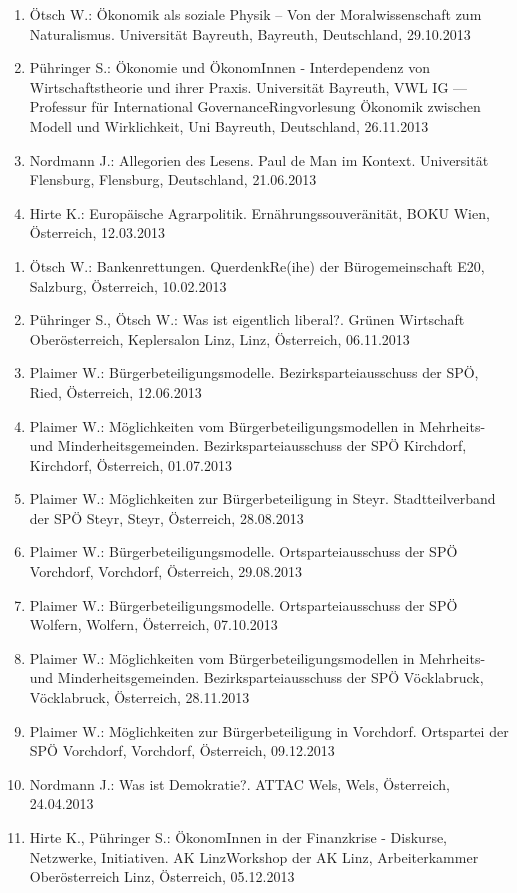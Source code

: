 \begin{enumerate}
	\item Ötsch W.: Ökonomik als soziale Physik – Von der Moralwissenschaft zum Naturalismus. Universität Bayreuth, Bayreuth, Deutschland, 29.10.2013
	\item Pühringer S.: Ökonomie und ÖkonomInnen - Interdependenz von Wirtschaftstheorie und ihrer Praxis. Universität Bayreuth, VWL IG — Professur für International GovernanceRingvorlesung Ökonomik zwischen Modell und Wirklichkeit, Uni Bayreuth, Deutschland, 26.11.2013
	\item Nordmann J.: Allegorien des Lesens. Paul de Man im Kontext. Universität Flensburg, Flensburg, Deutschland, 21.06.2013
	\item Hirte K.: Europäische Agrarpolitik. Ernährungssouveränität, BOKU Wien, Österreich, 12.03.2013
\end{enumerate}

\begin{enumerate}
	\item Ötsch W.: Bankenrettungen. QuerdenkRe(ihe) der Bürogemeinschaft E20, Salzburg, Österreich, 10.02.2013
	\item Pühringer S., Ötsch W.: Was ist eigentlich liberal?. Grünen Wirtschaft Oberösterreich, Keplersalon Linz, Linz, Österreich, 06.11.2013
	\item Plaimer W.: Bürgerbeteiligungsmodelle. Bezirksparteiausschuss  der SPÖ, Ried, Österreich, 12.06.2013
	\item Plaimer W.: Möglichkeiten vom Bürgerbeteiligungsmodellen in Mehrheits- und Minderheitsgemeinden. Bezirksparteiausschuss der SPÖ Kirchdorf, Kirchdorf, Österreich, 01.07.2013
	\item Plaimer W.: Möglichkeiten zur Bürgerbeteiligung in Steyr. Stadtteilverband  der SPÖ Steyr, Steyr, Österreich, 28.08.2013
	\item Plaimer W.: Bürgerbeteiligungsmodelle. Ortsparteiausschuss  der SPÖ Vorchdorf, Vorchdorf, Österreich, 29.08.2013
	\item Plaimer W.: Bürgerbeteiligungsmodelle. Ortsparteiausschuss der SPÖ Wolfern, Wolfern, Österreich, 07.10.2013
	\item Plaimer W.: Möglichkeiten vom Bürgerbeteiligungsmodellen in Mehrheits- und Minderheitsgemeinden. Bezirksparteiausschuss der SPÖ Vöcklabruck, Vöcklabruck, Österreich, 28.11.2013
	\item Plaimer W.: Möglichkeiten zur Bürgerbeteiligung in Vorchdorf. Ortspartei  der SPÖ Vorchdorf, Vorchdorf, Österreich, 09.12.2013
	\item Nordmann J.: Was ist Demokratie?. ATTAC Wels, Wels, Österreich, 24.04.2013
	\item Hirte K., Pühringer S.: ÖkonomInnen in der Finanzkrise - Diskurse, Netzwerke, Initiativen. AK LinzWorkshop der AK Linz, Arbeiterkammer Oberösterreich Linz, Österreich, 05.12.2013
\end{enumerate}

